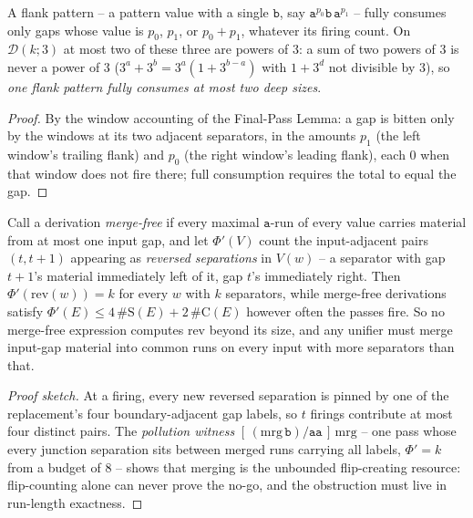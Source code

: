 \documentclass[runningheads,envcountsect]{llncs}
\begin{document}
\begin{lemma}
    \label{dich:lem:flankcap}
    A flank pattern -- a pattern value with a single $\mathtt b$, say $\mathtt a^{p_0}\mathtt b\,\mathtt a^{p_1}$ -- fully consumes only gaps whose value is $p_0$, $p_1$, or $p_0 + p_1$, whatever its firing count. On $\mathcal D(k;3)$ at most two of these three are powers of $3$: a sum of two powers of $3$ is never a power of $3$ ($3^a + 3^b = 3^a(1 + 3^{b-a})$ with $1 + 3^d$ not divisible by $3$), so \emph{one flank pattern fully consumes at most two deep sizes}.
\end{lemma}

\begin{proof}
    By the window accounting of the Final-Pass Lemma: a gap is bitten only by the windows at its two adjacent separators, in the amounts $p_1$ (the left window's trailing flank) and $p_0$ (the right window's leading flank), each $0$ when that window does not fire there; full consumption requires the total to equal the gap.
\end{proof}

\begin{lemma}
    \label{dich:lem:SB}
    Call a derivation \emph{merge-free} if every maximal $\mathtt a$-run of every value carries material from at most one input gap, and let $\Phi'(V)$ count the input-adjacent pairs $(t, t+1)$ appearing as \emph{reversed separations} in $V(w)$ -- a separator with gap $t{+}1$'s material immediately left of it, gap $t$'s immediately right. Then $\Phi'(\mathrm{rev}(w)) = k$ for every $w$ with $k$ separators, while merge-free derivations satisfy $\Phi'(E) \le 4\,\#\mathrm{S}(E) + 2\,\#\mathrm{C}(E)$ however often the passes fire. So no merge-free expression computes $\mathrm{rev}$ beyond its size, and any unifier must merge input-gap material into common runs on every input with more separators than that.
\end{lemma}

\begin{proof}[Proof sketch]
    At a firing, every new reversed separation is pinned by one of the replacement's four boundary-adjacent gap labels, so $t$ firings contribute at most four distinct pairs. The \emph{pollution witness} $[\,(\mathrm{mrg}\,\mathtt b)/\mathtt{aa}\,]\,\mathrm{mrg}$ -- one pass whose every junction separation sits between merged runs carrying all labels, $\Phi' = k$ from a budget of $8$ -- shows that merging is the unbounded flip-creating resource: flip-counting alone can never prove the no-go, and the obstruction must live in run-length exactness.
\end{proof}
\end{document}
